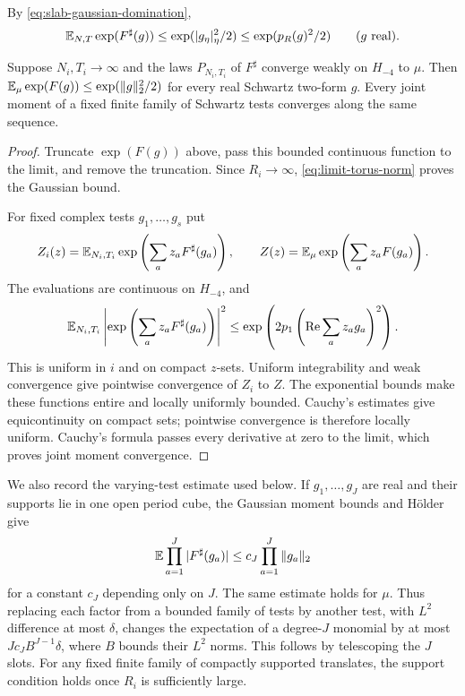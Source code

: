 By \eqref{eq:slab-gaussian-domination},
\begin{equation}\label{eq:limit-cutoff-G}
 \mathbb E_{N,T}\exp(F^\sharp(g))
       \le\exp(|g_\eta|_\eta^2/2)\le\exp(p_R(g)^2/2)
                          \qquad(g\text{ real}).
\end{equation}

\begin{proposition}\label{prop:vtm-periodic-moments}
Suppose $N_i,T_i\to\infty$ and the laws $P_{N_i,T_i}$ of
$F^\sharp$ converge weakly on $H_{-4}$ to $\mu$.
Then $\mathbb E_\mu\exp(F(g))\le\exp(\|g\|_2^2/2)$ for every real
Schwartz two-form $g$. Every joint moment of a fixed finite
family of Schwartz tests converges along the same sequence.
\end{proposition}

\begin{proof}
Truncate $\exp(F(g))$ above, pass this bounded continuous
function to the limit, and remove the truncation.
Since $R_i\to\infty$, \eqref{eq:limit-torus-norm} proves the
Gaussian bound.

For fixed complex tests $g_1,\ldots,g_s$ put
\[
 Z_i(z)=\mathbb E_{N_i,T_i}\exp\left(\sum_a z_aF^\sharp(g_a)\right),
 \qquad
 Z(z)=\mathbb E_\mu\exp\left(\sum_a z_aF(g_a)\right).
\]
The evaluations are continuous on $H_{-4}$, and
\[
 \mathbb E_{N_i,T_i}
 \left|\exp\left(\sum_a z_aF^\sharp(g_a)\right)\right|^2
 \le\exp\left(2p_1\left(\operatorname{Re}\sum_a z_ag_a\right)^2\right).
\]
This is uniform in $i$ and on compact $z$-sets.
Uniform integrability and weak convergence give pointwise
convergence of $Z_i$ to $Z$. The exponential bounds make
these functions entire and locally uniformly bounded.
Cauchy's estimates give equicontinuity on compact sets;
pointwise convergence is therefore locally uniform.
Cauchy's formula passes every derivative at zero to the limit,
which proves joint moment convergence.
\end{proof}

We also record the varying-test estimate used below.
If $g_1,\ldots,g_J$ are real and their supports lie in one
open period cube, the Gaussian moment bounds and H\"older
give
\[
 \mathbb E\prod_{a=1}^J|F^\sharp(g_a)|
                     \le c_J\prod_{a=1}^J\|g_a\|_2
\]
for a constant $c_J$ depending only on $J$.
The same estimate holds for $\mu$.
Thus replacing each factor from a bounded family of tests
by another test, with $L^2$ difference at most $\delta$,
changes the expectation of a degree-$J$ monomial by at most
$Jc_JB^{J-1}\delta$, where $B$ bounds their $L^2$ norms.
This follows by telescoping the $J$ slots. For any fixed
finite family of compactly supported translates, the
support condition holds once $R_i$ is sufficiently large.

